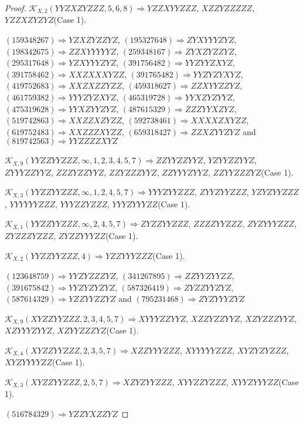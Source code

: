 \documentclass[12pt]{article}
\theoremstyle{plain}
\theoremstyle{definition}
\theoremstyle{remark}
\newcommand{\fancy}[1]{\mathcal{#1}}
\def\K{\fancy{K}}
\begin{document}
\begin{proof}
	$\K_{X,2}(YYZXZYZZZ,5, 6, 8)\Rightarrow $$YZZXYYZZZ$, $XZZYZZZZZ$, $YZZXZYZYZ$(Case 1).
	
	
	
	$(1 5 9 3 4 8 2 6 7)\Rightarrow YZXZYZZYZ$, $(1 9 5 3 2 7 6 4 8)\Rightarrow ZYXYYYZYZ$, $(1 9 8 3 4 2 6 7 5)\Rightarrow ZZXYYYYYZ$, $(2 5 9 3 4 8 1 6 7)\Rightarrow ZYXZYZZYZ$, $(2 9 5 3 1 7 6 4 8)\Rightarrow YZXYYYZYZ$, $(3 9 1 7 5 6 4 8 2)\Rightarrow YYZYYZXYZ$, $(3 9 1 7 5 8 4 6 2)\Rightarrow XXZXXXYZZ$, $(3 9 1 7 6 5 4 8 2)\Rightarrow YYZYZYXYZ$, $(4 1 9 7 5 2 6 8 3)\Rightarrow XXZXZZYZZ$, $(4 5 9 3 1 8 6 2 7)\Rightarrow ZZXYYZZYZ$, $(4 6 1 7 5 9 3 8 2)\Rightarrow YYYZYZXYZ$, $(4 6 5 3 1 9 7 2 8)\Rightarrow YYXZYZYYZ$, $(4 7 5 3 1 9 6 2 8)\Rightarrow YYXZYYZYZ$, $(4 8 7 6 1 5 3 2 9)\Rightarrow ZZZYYXZYZ$, $(5 1 9 7 4 2 8 6 3)\Rightarrow XXZZXZYZZ$, $(5 9 2 7 3 8 4 6 1)\Rightarrow XXXXZXYZZ$, $(6 1 9 7 5 2 4 8 3)\Rightarrow XXZZZXYZZ$, $(6 5 9 3 1 8 4 2 7)\Rightarrow ZZXZYYZYZ$ and $(8 1 9 7 4 2 5 6 3)\Rightarrow YYZZZZXYZ$
	
	
	$\K_{X,9}(YYZZYYZZZ,\infty,1, 2, 3, 4, 5, 7)\Rightarrow $$ZZYYZZYYZ$, $YZYYZZYYZ$, $ZYYYZZYYZ$, $ZZZYZZYYZ$, $ZZYZZZYYZ$, $ZZYYYZYYZ$, $ZZYYZZZYZ$(Case 1).
	
	$\K_{X,3}(YYZZYYZZZ,\infty,1, 2, 4, 5, 7)\Rightarrow $$YYYZYYZZZ$, $ZYYZYYZZZ$, $YZYZYYZZZ$, $YYYYYYZZZ$, $YYYZZYZZZ$, $YYYZYYYZZ$(Case 1).
	
	$\K_{X,1}(YYZZYYZZZ,\infty,2, 4, 5, 7)\Rightarrow $$ZYZZYYZZZ$, $ZZZZYYZZZ$, $ZYZYYYZZZ$, $ZYZZZYZZZ$, $ZYZZYYYZZ$(Case 1).
	
	$\K_{X,2}(YYZZYYZZZ,4)\Rightarrow $$YZZYYYZZZ$(Case 1).
	
	
	
	$(1 2 3 6 4 8 7 5 9)\Rightarrow YYZYZZZYZ$, $(3 4 1 2 6 7 8 9 5)\Rightarrow ZZYYZYYZZ$, $(3 9 1 6 7 5 8 4 2)\Rightarrow YYZYZYZYZ$, $(5 8 7 3 2 6 4 1 9)\Rightarrow ZYZZYYZYZ$, $(5 8 7 6 1 4 3 2 9)\Rightarrow YZZYYZZYZ$ and $(7 9 5 2 3 1 4 6 8)\Rightarrow ZYZYYYZYZ$
	
	
	$\K_{X,9}(XYZZYYZZZ,2, 3, 4, 5, 7)\Rightarrow $$XYYYZZYYZ$, $XZZYZZYYZ$, $XZYZZZYYZ$, $XZYYYZYYZ$, $XZYYZZZYZ$(Case 1).
	
	$\K_{X,4}(XYZZYYZZZ,2, 3, 5, 7)\Rightarrow $$XZZYYYZZZ$, $XYYYYYZZZ$, $XYZYZYZZZ$, $XYZYYYYZZ$(Case 1).
	
	$\K_{X,3}(XYZZYYZZZ,2, 5, 7)\Rightarrow $$XZYZYYZZZ$, $XYYZZYZZZ$, $XYYZYYYZZ$(Case 1).
	
	
	
	$(5 1 6 7 8 4 3 2 9)\Rightarrow YZZYXZZYZ$
	

\end{proof}
\end{document}

